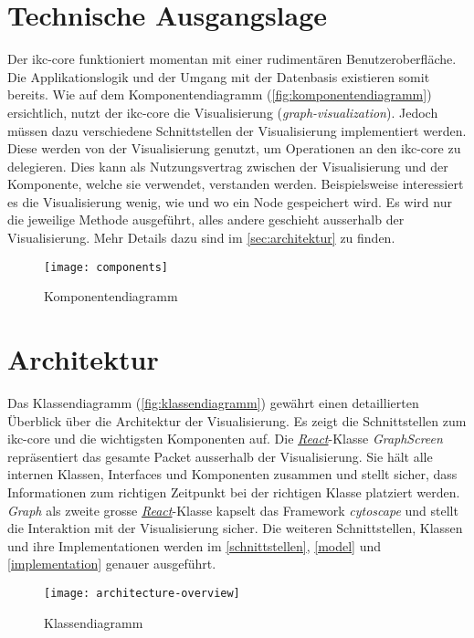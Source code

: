 \section{Technische Ausgangslage}
Der \gls{ikc-core} funktioniert momentan mit einer rudimentären Benutzeroberfläche. Die Applikationslogik und der Umgang mit der Datenbasis existieren somit bereits. Wie auf dem Komponentendiagramm (\autoref{fig:komponentendiagramm}) ersichtlich, nutzt der \gls{ikc-core} die Visualisierung (\textit{graph-visualization}). Jedoch müssen dazu verschiedene Schnittstellen der Visualisierung implementiert werden. Diese werden von der Visualisierung genutzt, um Operationen an den \gls{ikc-core} zu delegieren. Dies kann als Nutzungsvertrag zwischen der Visualisierung und der Komponente, welche sie verwendet, verstanden werden. Beispielsweise interessiert es die Visualisierung wenig, wie und wo ein \gls{Node} gespeichert wird. Es wird nur die jeweilige Methode ausgeführt, alles andere geschieht ausserhalb der Vi\-su\-ali\-si\-erung. Mehr Details dazu sind im \autoref{sec:architektur} zu finden.

\begin{figure}[htbp]
\centering
\texttt{[image: components]}
\caption{Komponentendiagramm}
\label{fig:komponentendiagramm}
\end{figure}

\section{Architektur}
\label{sec:architektur}

Das Klassendiagramm (\autoref{fig:klassendiagramm}) gewährt einen detaillierten Überblick über die Architektur der Visualisierung. Es zeigt die Schnittstellen zum \gls{ikc-core} und die wichtigsten Komponenten auf. Die \hyperref[react]{\textit{React}}-Klasse \textit{GraphScreen} repräsentiert das gesamte Packet ausserhalb der Visualisierung. Sie hält alle internen Klassen, Interfaces und Komponenten zusammen und stellt sicher, dass Informationen zum richtigen Zeitpunkt bei der richtigen Klasse platziert werden. \textit{Graph} als zweite grosse \hyperref[react]{\textit{React}}-Klasse kapselt das \gls{Framework} \textit{cytoscape} und stellt die Interaktion mit der Visualisierung sicher. Die weiteren Schnittstellen, Klassen und ihre Implementationen werden im \autoref{schnittstellen}, \autoref{model} und \autoref{implementation} genauer ausgeführt.

\begin{landscape}
\begin{figure}[htbp]
\centering
\texttt{[image: architecture-overview]}
\caption{Klassendiagramm}
\label{fig:klassendiagramm}
\end{figure}
\end{landscape}

